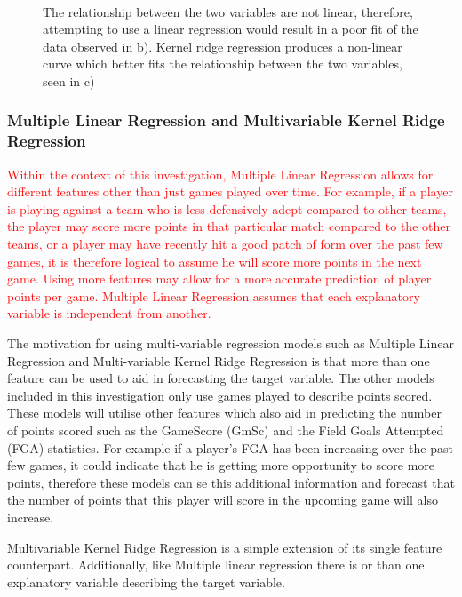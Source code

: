 \documentclass[a4paper,11pt,twoside]{article}
\begin{document}
\begin{figure} [h!]
{}\\
\caption{The relationship between the two variables are not linear, therefore, attempting to use a linear regression would result in a poor fit of the data observed in b). Kernel ridge regression produces a non-linear curve which better fits the relationship between the two variables, seen in c)}
\end{figure}

\subsubsection{Multiple Linear Regression and Multivariable Kernel Ridge Regression}

\textcolor{red}{Within the context of this investigation, Multiple Linear Regression allows for different features other than just games played over time. For example, if a player is playing against a team who is less defensively adept compared to other teams, the player may score more points in that particular match compared to the other teams, or a player may have recently hit a good patch of form over the past few games, it is therefore logical to assume he will score more points in the next game. Using more features may allow for a more accurate prediction of player points per game. Multiple Linear Regression assumes that each explanatory variable is independent from another.}

The motivation for using multi-variable regression models such as Multiple Linear Regression and Multi-variable Kernel Ridge Regression is that more than one feature can be used to aid in forecasting the target variable. The other models included in this investigation only use games played to describe points scored. These models will utilise other features which also aid in predicting the number of points scored such as the GameScore (GmSc) and the Field Goals Attempted (FGA) statistics. For example if a player's FGA has been increasing over the past few games, it could indicate that he is getting more opportunity to score more points, therefore these models can se this additional information and forecast that the number of points that this player will score in the upcoming game will also increase.

Multivariable Kernel Ridge Regression is a simple extension of its single feature counterpart. Additionally, like Multiple linear regression there is or than one explanatory variable describing the target variable. 
\end{document}
